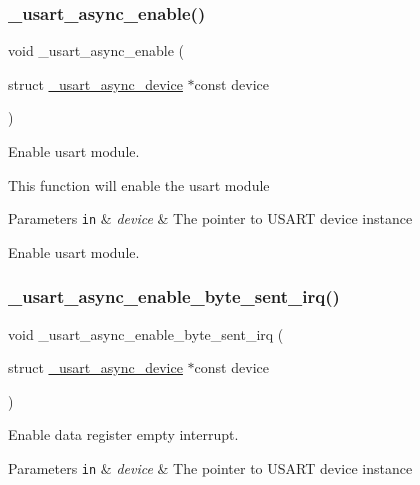 \subsubsection{\texorpdfstring{\+\_\+usart\+\_\+async\+\_\+enable()}{\_usart\_async\_enable()}}
{\footnotesize\ttfamily void \+\_\+usart\+\_\+async\+\_\+enable (\begin{DoxyParamCaption}\item[{struct \hyperlink{struct__usart__async__device}{\+\_\+usart\+\_\+async\+\_\+device} $\ast$const}]{device }\end{DoxyParamCaption})}



Enable usart module. 

This function will enable the usart module


\begin{DoxyParams}[1]{Parameters}
\mbox{\tt in}  & {\em device} & The pointer to U\+S\+A\+RT device instance\\
\hline
\end{DoxyParams}
Enable usart module. \mbox{\label{group___h_p_l_ga5dcb14840b2011da3a1d0f774dafa28d}} 
\subsubsection{\texorpdfstring{\+\_\+usart\+\_\+async\+\_\+enable\+\_\+byte\+\_\+sent\+\_\+irq()}{\_usart\_async\_enable\_byte\_sent\_irq()}}
{\footnotesize\ttfamily void \+\_\+usart\+\_\+async\+\_\+enable\+\_\+byte\+\_\+sent\+\_\+irq (\begin{DoxyParamCaption}\item[{struct \hyperlink{struct__usart__async__device}{\+\_\+usart\+\_\+async\+\_\+device} $\ast$const}]{device }\end{DoxyParamCaption})}



Enable data register empty interrupt. 


\begin{DoxyParams}[1]{Parameters}
\mbox{\tt in}  & {\em device} & The pointer to U\+S\+A\+RT device instance \\
\hline
\end{DoxyParams}
\mbox{\label{group___h_p_l_ga89bf3d02a7a3cca261900906ffd9ca76}} 
